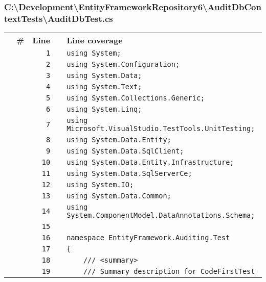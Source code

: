\documentclass[a4paper,10pt]{article}
\begin{document}
\subsubsection{C:\textbackslash Development\textbackslash EntityFrameworkRepository6\textbackslash AuditDbContextTests\textbackslash AuditDbTest.cs}
\begin{longtable}[l]{lrrll}
\textbf{} & \textbf{\#} & \textbf{Line} & \textbf{} & \textbf{Line coverage}\\
\cellcolor{gray} &  & \verb~1~ & & \verb~using System;~\\
\cellcolor{gray} &  & \verb~2~ & & \verb~using System.Configuration;~\\
\cellcolor{gray} &  & \verb~3~ & & \verb~using System.Data;~\\
\cellcolor{gray} &  & \verb~4~ & & \verb~using System.Text;~\\
\cellcolor{gray} &  & \verb~5~ & & \verb~using System.Collections.Generic;~\\
\cellcolor{gray} &  & \verb~6~ & & \verb~using System.Linq;~\\
\cellcolor{gray} &  & \verb~7~ & & \verb~using Microsoft.VisualStudio.TestTools.UnitTesting;~\\
\cellcolor{gray} &  & \verb~8~ & & \verb~using System.Data.Entity;~\\
\cellcolor{gray} &  & \verb~9~ & & \verb~using System.Data.SqlClient;~\\
\cellcolor{gray} &  & \verb~10~ & & \verb~using System.Data.Entity.Infrastructure;~\\
\cellcolor{gray} &  & \verb~11~ & & \verb~using System.Data.SqlServerCe;~\\
\cellcolor{gray} &  & \verb~12~ & & \verb~using System.IO;~\\
\cellcolor{gray} &  & \verb~13~ & & \verb~using System.Data.Common;~\\
\cellcolor{gray} &  & \verb~14~ & & \verb~using System.ComponentModel.DataAnnotations.Schema;~\\
\cellcolor{gray} &  & \verb~15~ & & \verb~~\\
\cellcolor{gray} &  & \verb~16~ & & \verb~namespace EntityFramework.Auditing.Test~\\
\cellcolor{gray} &  & \verb~17~ & & \verb~{~\\
\cellcolor{gray} &  & \verb~18~ & & \verb~    /// <summary>~\\
\cellcolor{gray} &  & \verb~19~ & & \verb~    /// Summary description for CodeFirstTest~\\

\end{longtable}
\end{document}
